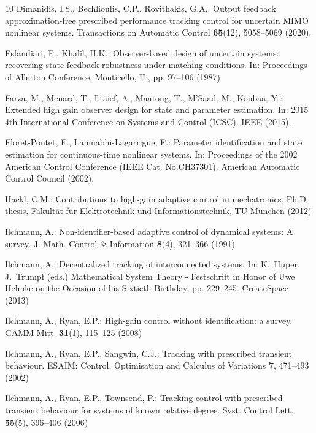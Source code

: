 \documentclass[ envcountsect, envcountsame]{svjour3}
\begin{document}
\begin{thebibliography}{10}
Dimanidis, I.S., Bechlioulis, C.P., Rovithakis, G.A.: Output feedback
  approximation-free prescribed performance tracking control for uncertain
  {MIMO} nonlinear systems.
 Transactions on Automatic Control \textbf{65}(12), 5058--5069
  (2020).
\newblock {}

Esfandiari, F., Khalil, H.K.: Observer-based design of uncertain systems:
  recovering state feedback robustness under matching conditions.
\newblock In: Proceedings of Allerton Conference, Monticello, IL, pp. 97--106
  (1987)

Farza, M., Menard, T., Ltaief, A., Maatoug, T., M'Saad, M., Koubaa, Y.:
  Extended high gain observer design for state and parameter estimation.
\newblock In: 2015 4th International Conference on Systems and Control
  ({ICSC}). {IEEE} (2015).
\newblock {}

Floret-Pontet, F., Lamnabhi-Lagarrigue, F.: Parameter identification and state
  estimation for continuous-time nonlinear systems.
\newblock In: Proceedings of the 2002 American Control Conference ({IEEE} Cat.
  No.{CH}37301). American Automatic Control Council (2002).
\newblock {}

Hackl, C.M.: Contributions to high-gain adaptive control in mechatronics.
\newblock Ph.D. thesis, Fakult{\"a}t f{\"u}r Elektrotechnik und
  Informationstechnik, TU M{\"u}nchen (2012)
  
  
Ilchmann, A.: Non-identifier-based adaptive control of dynamical systems: A
  survey.
 J. Math. Control \& Information \textbf{8}(4), 321--366 (1991)


Ilchmann, A.: Decentralized tracking of interconnected systems.
\newblock In: K.~H\"{u}per, J.~Trumpf (eds.) Mathematical System Theory -
  Festschrift in Honor of Uwe Helmke on the Occasion of his Sixtieth Birthday,
  pp. 229--245. CreateSpace (2013)

Ilchmann, A., Ryan, E.P.: High-gain control without identification: a survey.
\newblock GAMM Mitt. \textbf{31}(1), 115--125 (2008)

Ilchmann, A., Ryan, E.P., Sangwin, C.J.: Tracking with prescribed transient
  behaviour.
\newblock ESAIM: Control, Optimisation and Calculus of Variations \textbf{7},
  471--493 (2002)

Ilchmann, A., Ryan, E.P., Townsend, P.: Tracking control with prescribed
  transient behaviour for systems of known relative degree.
\newblock Syst. Control Lett. \textbf{55}(5), 396--406 (2006)


\end{thebibliography}
\end{document}
